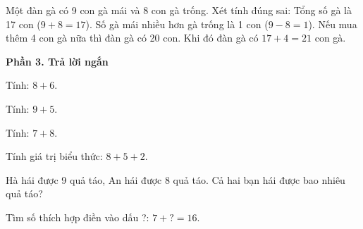\begin{ex} %
Một đàn gà có 9 con gà mái và 8 con gà trống. Xét tính đúng sai:
\choiceTF
{\True Tổng số gà là 17 con ($9 + 8 = 17$).}
{\True Số gà mái nhiều hơn gà trống là 1 con ($9 - 8 = 1$).}
{Nếu mua thêm 4 con gà nữa thì đàn gà có 20 con.}
{\True Khi đó đàn gà có $17 + 4 = 21$ con gà.}
\end{ex}

\textbf{Phần 3. Trả lời ngắn}

\begin{ex} %
Tính: $8 + 6$.
\end{ex}

\begin{ex} %
Tính: $9 + 5$.
\end{ex}

\begin{ex} %
Tính: $7 + 8$.
\end{ex}

\begin{ex} %
Tính giá trị biểu thức: $8 + 5 + 2$.
\end{ex}

\begin{ex} %
Hà hái được 9 quả táo, An hái được 8 quả táo. Cả hai bạn hái được bao nhiêu quả táo?
\end{ex}

\begin{ex} %
Tìm số thích hợp điền vào dấu ?: $7 + ? = 16$.
\end{ex}
